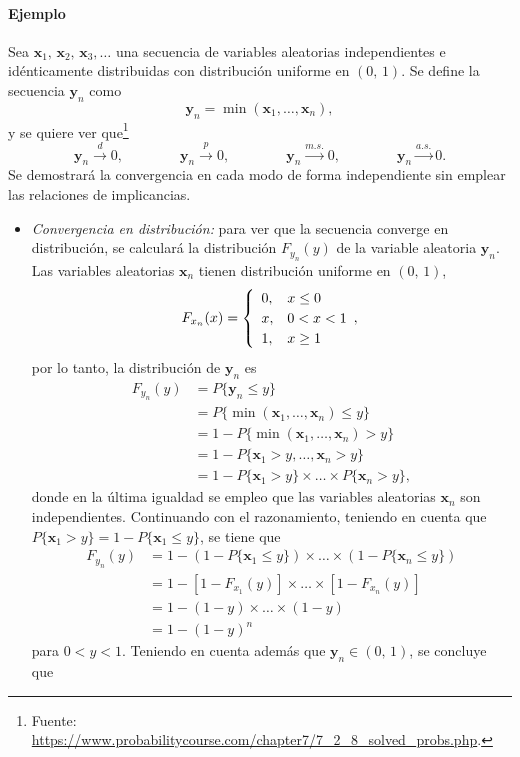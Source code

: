 \documentclass[a4paper]{report}
\newcommand{\x}{\mathbf{x}}
\newcommand{\y}{\mathbf{y}}
\begin{document}
\paragraph{Ejemplo} Sea \(\x_1,\,\x_2,\,\x_3,\dots\) una secuencia de variables aleatorias independientes e idénticamente distribuidas con distribución uniforme en \((0,\,1)\). Se define la secuencia \(\y_n\) como
\[
 \y_n=\min(\x_1,\dots,\x_n),
\]
y se quiere ver que\footnote{Fuente: \url{https://www.probabilitycourse.com/chapter7/7_2_8_solved_probs.php}.}
\[
 \y_n\overset{d}{\longrightarrow}0,\qquad\qquad \y_n\overset{p}{\longrightarrow}0,\qquad\qquad 
 \y_n\overset{m.s.}{\longrightarrow}0,\qquad\qquad \y_n\overset{a.s.}{\longrightarrow}0.
\]
Se demostrará la convergencia en cada modo de forma independiente sin emplear las relaciones de implicancias.
\begin{itemize}
 \item \emph{Convergencia en distribución: } para ver que la secuencia converge en distribución, se calculará la distribución \(F_{y_n}(y)\) de la variable aleatoria \(\y_n\). Las variables aleatorias \(\x_n\) tienen distribución uniforme en \((0,\,1)\),
\[\def\arraystretch{1.2}
 F_{x_n}(x)=
 \left\{\begin{array}{ll}
  0, & x\leq 0\\
  x, & 0<x< 1\\
  1, & x\geq1
 \end{array}, \right.
\]
por lo tanto, la distribución de \(\y_n\) es
\begin{align*}
 F_{y_n}(y)&=P\{\y_n\leq y\}\\
  &=P\{\min(\x_1,\dots,\x_n)\leq y\}\\
  &=1-P\{\min(\x_1,\dots,\x_n)>y\}\\
  &=1-P\{\x_1>y,\dots,\x_n>y\}\\
  &=1-P\{\x_1>y\}\times\dots\times P\{\x_n>y\},
\end{align*}
donde en la última igualdad se empleo que las variables aleatorias \(\x_n\) son independientes. Continuando con el razonamiento, teniendo en cuenta que \(P\{\x_1>y\}=1-P\{\x_1\leq y\}\), se tiene que
\begin{align*}
 F_{y_n}(y)&=1-(1-P\{\x_1\leq y\})\times\dots\times(1-P\{\x_n\leq y\})\\
  &=1-[1-F_{x_1}(y)]\times\dots\times[1-F_{x_n}(y)]\\
  &=1-(1-y)\times\dots\times(1-y)\\
  &=1-(1-y)^n
\end{align*}
para \(0<y<1\). Teniendo en cuenta además que \(\y_n\in(0,\,1)\), se concluye que

\end{itemize}
\end{document}
